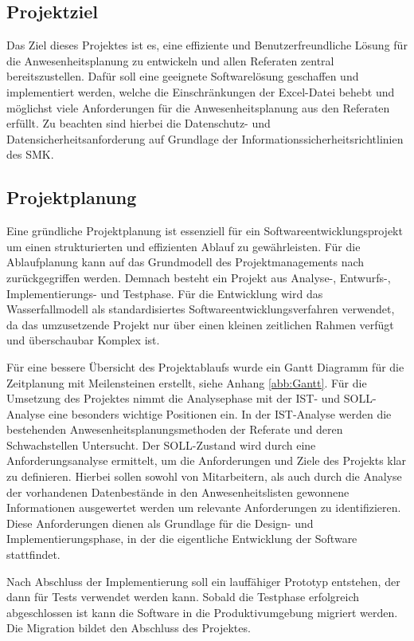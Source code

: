 \subsection{Projektziel}
\label{sec:Projektziel}

Das Ziel dieses Projektes ist es, eine effiziente und Benutzerfreundliche Lösung für die Anwesenheitsplanung zu entwickeln und allen Referaten zentral bereitszustellen. Dafür soll eine geeignete Softwarelösung geschaffen und implementiert werden, welche die Einschränkungen der Excel-Datei behebt und möglichst viele Anforderungen für die Anwesenheitsplanung aus den Referaten erfüllt. Zu beachten sind hierbei die Datenschutz- und Datensicherheitsanforderung auf Grundlage der Informationssicherheitsrichtlinien des SMK.

\subsection{Projektplanung}
\label{sec:Projektplanung}

Eine gründliche Projektplanung ist essenziell für ein Softwareentwicklungsprojekt um einen strukturierten und effizienten Ablauf zu gewährleisten. Für die Ablaufplanung kann auf das Grundmodell des Projektmanagements nach \cite[S.225]{dehler-2013} zurückgegriffen werden. Demnach besteht ein Projekt aus Analyse-, Entwurfs-, Implementierungs- und Testphase. Für die Entwicklung wird das Wasserfallmodell als standardisiertes Softwareentwicklungsverfahren verwendet, da das umzusetzende Projekt nur über einen kleinen zeitlichen Rahmen verfügt und überschaubar Komplex ist.

Für eine bessere Übersicht des Projektablaufs wurde ein Gantt Diagramm für die Zeitplanung mit Meilensteinen erstellt, siehe Anhang \ref{abb:Gantt}. Für die Umsetzung des Projektes nimmt die Analysephase mit der IST- und SOLL-Analyse eine besonders wichtige Positionen ein. In der IST-Analyse werden die bestehenden Anwesenheitsplanungsmethoden der Referate und deren Schwachstellen Untersucht. Der SOLL-Zustand wird durch eine Anforderungsanalyse ermittelt, um die Anforderungen und Ziele des Projekts klar zu definieren. Hierbei sollen sowohl von Mitarbeitern, als auch durch die Analyse der vorhandenen Datenbestände in den Anwesenheitslisten gewonnene Informationen ausgewertet werden um relevante Anforderungen zu identifizieren. Diese Anforderungen dienen als Grundlage für die Design- und Implementierungsphase, in der die eigentliche Entwicklung der Software stattfindet.

Nach Abschluss der Implementierung soll ein lauffähiger Prototyp entstehen, der dann für Tests verwendet werden kann. Sobald die Testphase erfolgreich abgeschlossen ist kann die Software in die Produktivumgebung migriert werden. Die Migration bildet den Abschluss des Projektes.


